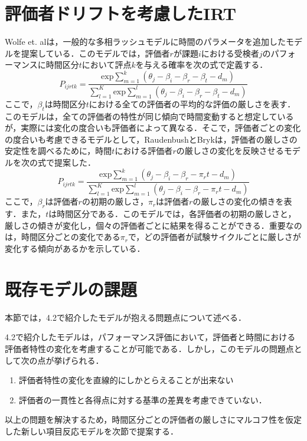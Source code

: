 \documentclass[a4paper,11pt,oneside,openany]{jsbook}
\begin{document}
\section{評価者ドリフトを考慮したIRT}

Wolfe et. al\cite{Wolfe}は，一般的な多相ラッシュモデルに時間のパラメータを追加したモデルを提案している．このモデルでは，評価者$r$が課題$i$における受検者$j$のパフォーマンスに時間区分$t$において評点$k$を与える確率を次の式で定義する．
\begin{displaymath}
P_{ijrtk}=\frac{\mathrm{exp}\sum_{m=1}^{k}(\theta_{j}-\beta_{i}-\beta_{r}-\beta_{t}-d_{m})}{\sum_{l=1}^{K}\mathrm{exp}\sum_{m=1}^{l}(\theta_{j}-\beta_{i}-\beta_{r}-\beta_{t}-d_{m})}
\end{displaymath}
ここで，$\beta_t$は時間区分$t$における全ての評価者の平均的な評価の厳しさを表す．
このモデルは，全ての評価者の特性が同じ傾向で時間変動すると想定しているが，実際には変化の度合いも評価者によって異なる．そこで，評価者ごとの変化の度合いも考慮できるモデルとして，RaudenbushとBryk\cite{Raudenbush}は，評価者の厳しさの安定性を調べるために，時間$t$における評価者$r$の厳しさの変化を反映させるモデルを次の式で提案した．
\begin{displaymath}
P_{ijrtk}=\frac{\mathrm{exp}\sum_{m=1}^{k}(\theta_{j}-\beta_{i}-\beta_{r} - \pi_{r}t-d_{m})}{\sum_{l=1}^{K}\mathrm{exp}\sum_{m=1}^{l}(\theta_{j}-\beta_{i}-\beta_{r} - \pi_{r}t-d_{m})}
\end{displaymath}
ここで，$\beta_{r}$は評価者$r$の初期の厳しさ，$\pi_{r}$は評価者$r$の厳しさの変化の傾きを表す．また，$t$は時間区分である．このモデルでは，各評価者の初期の厳しさと，厳しさの傾きが変化し，個々の評価者ごとに結果を得ることができる．重要なのは，時間区分ごとの変化である$\pi_{r}$で，どの評価者が試験サイクルごとに厳しさが変化する傾向があるかを示している．

\section{既存モデルの課題}
本節では，4.2で紹介したモデルが抱える問題点について述べる．

4.2で紹介したモデルは，パフォーマンス評価において，評価者と時間における評価者特性の変化を考慮することが可能である．しかし，このモデルの問題点として次の点が挙げられる．
\begin{enumerate}
  \item 評価者特性の変化を直線的にしかとらえることが出来ない
  \item 評価者の一貫性と各得点に対する基準の差異を考慮できていない．
\end{enumerate}  
以上の問題を解決するため，時間区分ごとの評価者の厳しさにマルコフ性を仮定した新しい項目反応モデルを次節で提案する．
\newpage
\end{document}
